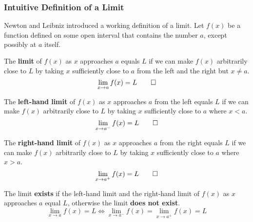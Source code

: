 \subsubsection{Intuitive Definition of a Limit}
Newton and Leibniz introduced a working definition of a limit.
Let \(f(x)\) be a function defined on some open interval that contains the
number \(a\), except possibly at \(a\) itself.
\begin{definition}
    The \textbf{limit} of \(f(x)\) as \(x\) approaches \(a\) equals \(L\) if
    we can make \(f(x)\) arbitrarily close to \(L\) by taking \(x\)
    sufficiently close to \(a\) from the left and the right but \(x\neq a\).
    \[\lim_{x\to a}f(x)=L\qedhere\]
\end{definition}
\begin{definition}
    The \textbf{left-hand limit} of \(f(x)\) as \(x\) approaches \(a\) from
    the left equals \(L\) if we can make \(f(x)\) arbitrarily close to \(L\)
    by taking \(x\) sufficiently close to \(a\) where \(x<a\).
    \[\lim_{x\to a^-}f(x)=L\qedhere\]
\end{definition}
\begin{definition}
    The \textbf{right-hand limit} of \(f(x)\) as \(x\) approaches \(a\) from
    the right equals \(L\) if we can make \(f(x)\) arbitrarily close to \(L\)
    by taking \(x\) sufficiently close to \(a\) where \(x>a\).
    \[\lim_{x\to a^+}f(x)=L\qedhere\]
\end{definition}
The limit \textbf{exists} if the left-hand limit and the right-hand limit of
\(f(x)\) as \(x\) approaches \(a\) equal \(L\), otherwise the limit
\textbf{does not exist}.
\[\lim_{x\to a}f(x)=L \iff \lim_{x\to a^-}f(x) = \lim_{x\to a^+}f(x)=L\]